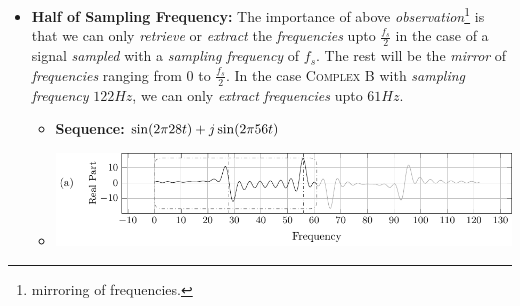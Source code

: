 \documentclass[../../course]{subfiles}
\begin{document}
\begin{itemize} [label=]
\begin{itemize} [label=]
\begin{minipage}[b] {0.85\textwidth}
                \end{minipage}

            \item
                In Figure \ref{plt:freqMirror} we can see that they don't \emph{exactly}
                overlap. This is because in our case the \emph{input sequence} was not a
                \emph{real sequence} instead it was a \emph{complex sequence}. If the
                \emph{input} was a \emph{real sequence}, the \textsc{dtft} would have
                shown so called a \emph{hermitian symmetry}\footnote{symmetry that seen
                in \emph{hermitian functions} (see the
                \textbf{\href{https://en.m.wikipedia.org/wiki/Hermitian_function}
                {Wikipedia article}}).}. Neither less, they convey the same \emph{information}. Or so
                to say, the \emph{information content} in range \firstRange \emph{mirrors
                into} \secondRange range.

        \end{itemize}

    \item \textbf{Half of Sampling Frequency:} The importance of above
        \emph{observation}\footnote{mirroring of frequencies.} is that we can
        only \emph{retrieve} or \emph{extract} the \emph{frequencies} upto
        $\frac{f_{s}}{2}$ in the case of a signal \emph{sampled} with a
        \emph{sampling frequency} of $f_{s}$. The rest will be the \emph{mirror}
        of \emph{frequencies} ranging from $0$ to $\frac{f_{s}}{2}$. In the
        case \textsc{Complex B} with \emph{sampling frequency} $122 \si{Hz}$,
        we can only \emph{extract} \emph{frequencies} upto $61 \si{Hz}$.

        \begin{itemize} [label=]

            \item \textbf{Sequence:} $\sin(2 \pi 28 t) + j \sin(2 \pi 56 t)$

            \item
                \begin{minipage}[b] {0.85\textwidth}
                    \vspace{6pt}
                    \centering
                     {
                        \includegraphics[height = 0.8\textheight] {tikzpics/plotHalfSampFreq.pdf}
                    }


\end{minipage}
\end{itemize}
\end{itemize}
\end{document}
